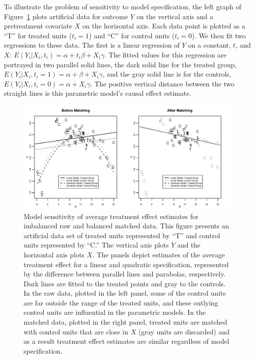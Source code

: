 \documentclass[11pt,titlepage]{article}
\begin{document}
To illustrate the problem of sensitivity to model specification, the
left graph of Figure~\ref{fg:extrap} plots artificial data for outcome
$Y$ on the vertical axis and a pretreatment covariate $X$ on the
horizontal axis.  Each data point is plotted as a ``T'' for treated
units ($t_i=1$) and ``C'' for control units ($t_i=0$).  We then fit
two regressions to these data.  The first is a linear regression of
$Y$ on a constant, $t$, and $X$: $E(Y_i|X_i,t_i)=\alpha + t_i\beta +
X_i\gamma$.  The fitted values for this regression are portrayed in
two parallel solid lines, the dark solid line for the treated group,
$E(Y_i|X_i,t_i=1)=\alpha+\beta+X_i\gamma$, and the gray solid line is
for the controls, $E(Y_i|X_i,t_i=0)=\alpha+X_i\gamma$. The positive
vertical distance between the two straight lines is this parametric
model's causal effect estimate.

\begin{figure}[t] 
 \begin{center}
   \includegraphics[width=6in]{figs/olspanel-thick.pdf}
  \end{center}
  \vspace{-0.275in}
  \caption{Model sensitivity of average treatment effect estimates for
    imbalanced raw and balanced matched data.  This figure presents an
    artificial data set of treated units represented by ``T'' and
    control units represented by ``C.'' The vertical axis plots $Y$
    and the horizontal axis plots $X$.  The panels depict estimates of
    the average treatment effect for a linear and quadratic
    specification, represented by the difference between parallel
    lines and parabolas, respectively.  Dark lines are fitted to the
    treated points and gray to the controls.  In the raw data, plotted
    in the left panel, some of the control units are far outside the
    range of the treated units, and these outlying control units are
    influential in the parametric models.  In the matched data,
    plotted in the right panel, treated units are matched with control
    units that are close in $X$ (gray units are discarded) and as a
    result treatment effect estimates are similar regardless of model
    specification.}
  \label{fg:extrap}
\end{figure}
\end{document}
